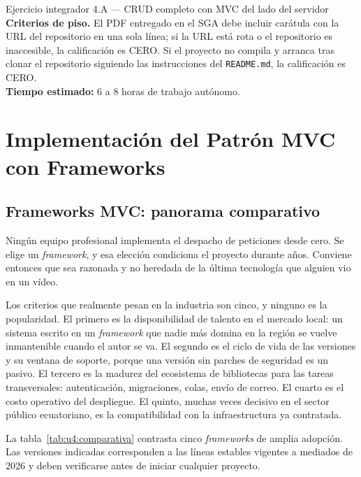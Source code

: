 \documentclass[11pt,a4paper,openany]{book}
\begin{document}
\begin{cajaejercicio}{Ejercicio integrador 4.A --- CRUD completo con MVC del lado del servidor}
	\textbf{Criterios de piso.} El PDF entregado en el SGA debe incluir carátula con la URL del repositorio en una sola línea; si la URL está rota o el repositorio es inaccesible, la calificación es CERO. Si el proyecto no compila y arranca tras clonar el repositorio siguiendo las instrucciones del \texttt{README.md}, la calificación es CERO.\\[4pt]
	\textbf{Tiempo estimado:} 6 a 8 horas de trabajo autónomo.
\end{cajaejercicio}

\section{Implementación del Patrón MVC con Frameworks}
\label{sec:u4:frameworks}

\subsection{Frameworks MVC: panorama comparativo}
\label{sec:u4:panorama}

Ningún equipo profesional implementa el despacho de peticiones desde cero. Se elige un \emph{framework}, y esa elección condiciona el proyecto durante años. Conviene entonces que sea razonada y no heredada de la última tecnología que alguien vio en un vídeo.

Los criterios que realmente pesan en la industria son cinco, y ninguno es la popularidad. El primero es la disponibilidad de talento en el mercado local: un sistema escrito en un \emph{framework} que nadie más domina en la región se vuelve inmantenible cuando el autor se va. El segundo es el ciclo de vida de las versiones y su ventana de soporte, porque una versión sin parches de seguridad es un pasivo. El tercero es la madurez del ecosistema de bibliotecas para las tareas transversales: autenticación, migraciones, colas, envío de correo. El cuarto es el costo operativo del despliegue. El quinto, muchas veces decisivo en el sector público ecuatoriano, es la compatibilidad con la infraestructura ya contratada.

La tabla~\ref{tab:u4:comparativa} contrasta cinco \emph{frameworks} de amplia adopción. Las versiones indicadas corresponden a las líneas estables vigentes a mediados de 2026 y deben verificarse antes de iniciar cualquier proyecto.
\end{document}
